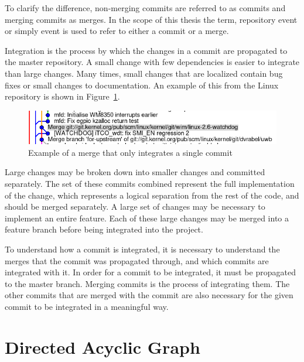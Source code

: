 To clarify the difference, non-merging commits are referred to as
commits and merging commits as merges.
In the scope of this thesis the term, repository event or simply event
is used to refer to either a commit or a merge.

Integration is the process by which the changes in a commit are
propagated to the master repository.
A small change with few dependencies is easier to integrate than large changes.
Many times, small changes that are localized contain bug fixes or small
changes to documentation.
An example of this from the Linux repository is shown in
Figure~\ref{fig:single_commit_merge}.

\begin{figure}[htpb]
  \centering
  \includegraphics[width=0.8\linewidth]{Figures/background/single_commit.png}
  \caption{Example of a merge that only integrates a single commit}
  \label{fig:single_commit_merge}
\end{figure}

Large changes may be broken down into smaller changes and committed
separately.
The set of these commits combined represent the full implementation of
the change,
which represents a logical separation from the rest of the code, and
should be merged separately.
A large set of changes may be necessary to implement an entire feature.
Each of these large changes may be merged into a feature branch before
being integrated into the project.

To understand how a commit is integrated, it is necessary to understand
the merges that the commit was propagated through, and which commits are
integrated with it.
In order for a commit to be integrated, it must be propagated to the
master branch.
Merging commits is the process of integrating them.
The other commits that are merged with the commit are also necessary for
the given commit to be integrated in a meaningful way.

\section{Directed Acyclic Graph}
\label{sec:directed_acyclic_graph}

